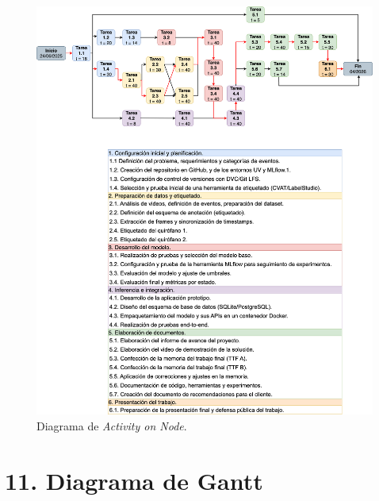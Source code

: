 \documentclass[
11pt, %
]{charter}
\begin{document}
\begin{figure}[htpb]
\centering 
\includegraphics[width=1\textwidth]{./Figuras/CEIA-GDP-Esquema-AoN.table.png}
\caption{Diagrama de \textit{Activity on Node}.}
\label{fig:AoN}
\end{figure}



\section{11. Diagrama de Gantt}
\label{sec:gantt}
\end{document}
